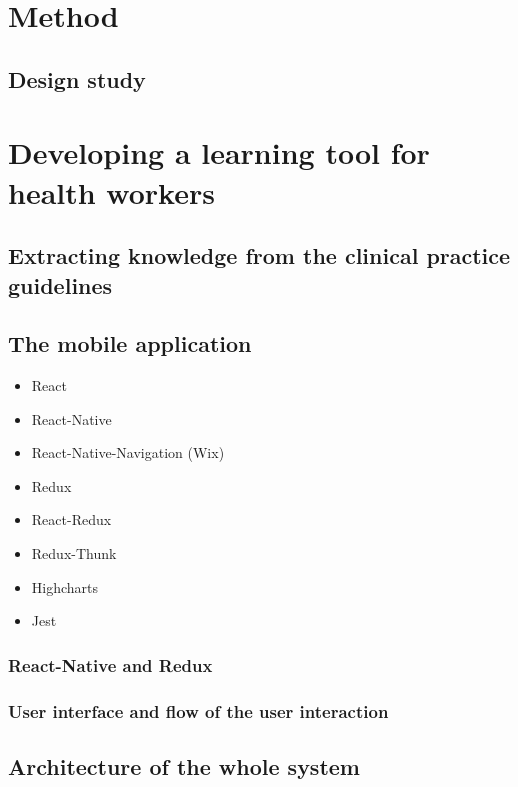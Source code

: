 \documentclass[a4paper,12pt]{book}
\begin{document}
\frontmatter


\tableofcontents
\mainmatter





\chapter{Method}
\section{Design study}





\chapter{Developing a learning tool for health workers}
\section{Extracting knowledge from the clinical  practice guidelines}







\section{The mobile application}
\begin{itemize}
	\item React
	\item React-Native
	\item React-Native-Navigation (Wix)
	\item Redux
	\item React-Redux
	\item Redux-Thunk
	\item Highcharts
	\item Jest
\end{itemize}
\subsection{React-Native and Redux}
\subsection{User interface and flow of the user interaction}
\section{Architecture of the whole system}
\end{document}
